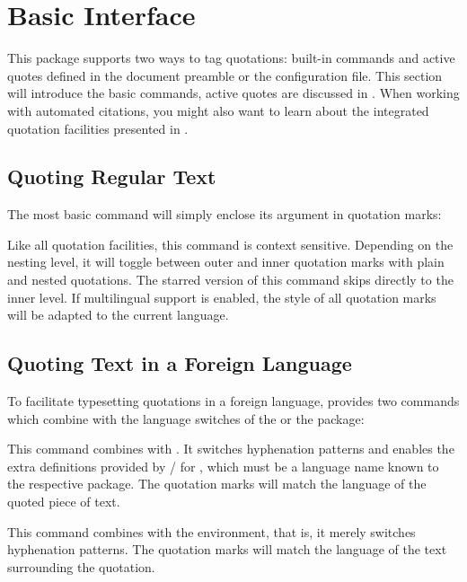 \documentclass{ltxdockit}[2010/09/26]
\begin{document}
\section{Basic Interface}
\label{bas}

This package supports two ways to tag quotations: built-in commands and active quotes defined in the document preamble or the configuration file. This section will introduce the basic commands, active quotes are discussed in . When working with automated citations, you might also want to learn about the integrated quotation facilities presented in .

\subsection{Quoting Regular Text}
\label{bas:reg}

The most basic command will simply enclose its argument in quotation marks:

\begin{ltxsyntax}


Like all quotation facilities, this command is context sensitive. Depending on the nesting level, it will toggle between outer and inner quotation marks with plain and nested quotations. The starred version of this command skips directly to the inner level. If multilingual support is enabled, the style of all quotation marks will be adapted to the current language.

\end{ltxsyntax}

\subsection{Quoting Text in a Foreign Language}
\label{bas:bbl}

To facilitate typesetting quotations in a foreign language,  provides two commands which combine  with the language switches of the  or the  package:

\begin{ltxsyntax}


This command combines  with . It switches hyphenation patterns and enables the extra definitions provided by \slash{} for , which must be a language name known to the respective package. The quotation marks will match the language of the quoted piece of text.


This command combines  with the  environment, that is, it merely switches hyphenation patterns. The quotation marks will match the language of the text surrounding the quotation.

\end{ltxsyntax}
\end{document}
